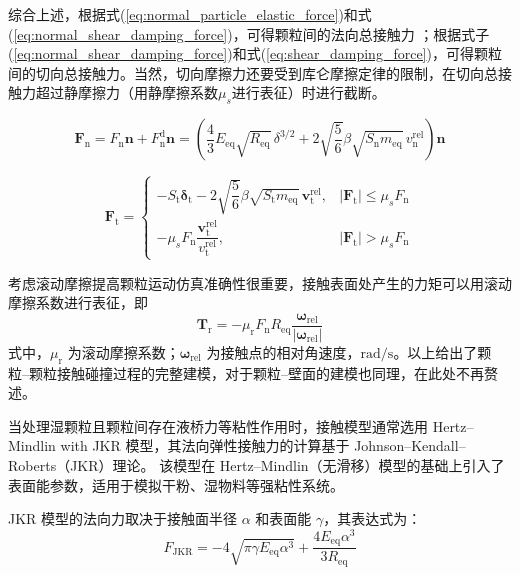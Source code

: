 综合上述，根据式(\ref{eq:normal_particle_elastic_force})和式(\ref{eq:normal_shear_damping_force})，可得颗粒间的法向总接触力 ；根据式子(\ref{eq:normal_shear_damping_force})和式(\ref{eq:shear_damping_force})，可得颗粒间的切向总接触力。当然，切向摩擦力还要受到库仑摩擦定律的限制，在切向总接触力超过静摩擦力（用静摩擦系数\(\mu_s\)进行表征）时进行截断。

\begin{equation}
    \bm{F}_{\mathrm{n}} = F_{\mathrm{n}}\bm{n} + F_{\mathrm{n}}^{\mathrm{d}}\bm{n} = \left(\frac{4}{3}E_{\mathrm{eq}}\sqrt{R_{\mathrm{eq}}}\,\delta^{3/2} + 2\sqrt{\frac{5}{6}}\beta\sqrt{S_{\mathrm{n}}m_{\mathrm{eq}}}\,v_{\mathrm{n}}^{\mathrm{rel}}\right)\bm{n}
    \label{eq:total_normal_force}
\end{equation}

\begin{equation}
    \bm{F}_{\mathrm{t}} = 
    \begin{cases}
        -S_{\mathrm{t}}\bm{\delta}_{\mathrm{t}} - 2\sqrt{\dfrac{5}{6}}\beta\sqrt{S_{\mathrm{t}}m_{\mathrm{eq}}}\,\bm{v}_{\mathrm{t}}^{\mathrm{rel}}, & |\bm{F}_{\mathrm{t}}| \leq \mu_s F_{\mathrm{n}} \\[10pt]
        -\mu_s F_{\mathrm{n}} \dfrac{\bm{v}_{\mathrm{t}}^{\mathrm{rel}}}{v_{\mathrm{t}}^{\mathrm{rel}}}, & |\bm{F}_{\mathrm{t}}| > \mu_s F_{\mathrm{n}}
    \end{cases}
    \label{eq:total_shear_force}
\end{equation}

考虑滚动摩擦提高颗粒运动仿真准确性很重要，接触表面处产生的力矩可以用滚动摩擦系数进行表征，即
\begin{equation}
    \bm{T}_{\mathrm{r}} = -\mu_{\mathrm{r}} F_{\mathrm{n}} R_{\mathrm{eq}} \frac{\bm{\omega}_{\mathrm{rel}}}{|\bm{\omega}_{\mathrm{rel}}|}
    \label{eq:rolling_torque}
\end{equation}
式中，\(\mu_{\mathrm{r}}\) 为滚动摩擦系数；\(\bm{\omega}_{\mathrm{rel}}\) 为接触点的相对角速度，\(\mathrm{rad/s}\)。以上给出了颗粒--颗粒接触碰撞过程的完整建模，对于颗粒--壁面的建模也同理，在此处不再赘述。

当处理湿颗粒且颗粒间存在液桥力等粘性作用时，接触模型通常选用 Hertz--Mindlin with JKR 模型，其法向弹性接触力的计算基于 Johnson--Kendall--Roberts（JKR）理论。
该模型在 Hertz--Mindlin（无滑移）模型的基础上引入了表面能参数，适用于模拟干粉、湿物料等强粘性系统。

JKR 模型的法向力取决于接触面半径 $\alpha$ 和表面能 $\gamma$，其表达式为：
\begin{equation}
    F_{\mathrm{JKR}}
    = -4\sqrt{\pi\gamma E_{\mathrm{eq}}\alpha^{3}}
    + \frac{4E_{\mathrm{eq}}\alpha^{3}}{3R_{\mathrm{eq}}}
    \label{eq:JKR_force}
\end{equation}

